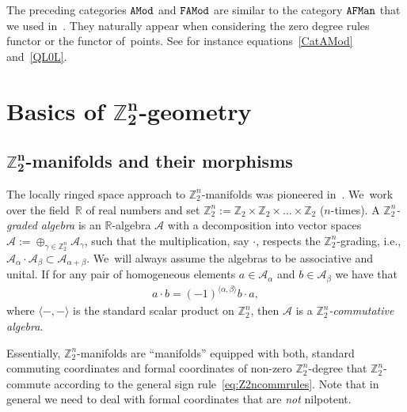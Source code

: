 \documentclass[10pt,a4paper]{amsart}
\newcommand{\R}{{\mathbb R}}
\newcommand{\Z}{{\mathbb Z}}
\newcommand{\0}{\otimes}
\numberwithin{equation}{section}
\begin{document}
The preceding categories $\tt AMod$ and $\tt FAMod$ are similar to the category $\tt AFMan$ that we used in~\cite{Bruce:2019b}. They naturally appear when considering the zero degree rules functor or the functor of~points. See for instance equations~\eqref{CatAMod} and~\eqref{QL0L}.
%
\section[Basics of Z2n-geometry]
{Basics of $\boldsymbol{\Z_2^n}$-geometry}\label{app:ZZnGeom}

\subsection[Z2n-manifolds and their morphisms]
{$\boldsymbol{\Z_2^n}$-manifolds and their morphisms}

The locally ringed space approach to $\Z_{2}^{n}$-manifolds was pioneered in~\cite{Covolo:2016}. We~work over the field~$\R$ of real numbers and set $\Z_2^n := \Z_2 \times \Z_2 \times \dots\times\Z_2$ ($n$-times). A \emph{$\Z_2^n$-graded algebra} is an $\R$-algebra $\mathcal{A}$ with a decomposition into vector spaces $\mathcal{A} := \oplus_{\gamma \in \Z_2^n} \mathcal{A}_\gamma$, such that the multiplication, say $\cdot$, respects the $\Z_2^n$-grading, i.e., $\mathcal{A}_\alpha \cdot \mathcal{A}_\beta \subset \mathcal{A}_{\alpha + \beta}$. We~will always assume the algebras to be associative and unital. If for any pair of homogeneous elements $a \in \mathcal{A}_\alpha$ and $b \in \mathcal{A}_\beta$ we have that
%
\begin{gather}\label{eq:Z2ncommrules}
a \cdot b = (-1)^{\langle \alpha , \beta\rangle } b \cdot a,
\end{gather}
%
where $\langle -, -\rangle$ is the standard scalar product on $\Z_2^n$, then $\mathcal{A}$ is a \emph{$\Z_2^n$-commutative algebra}.

Essentially, $\Z_2^n$-manifolds are ``manifolds'' equipped with both, standard commuting coordinates and formal coordinates of non-zero $\Z_2^n$-degree that $\Z_2^n$-commute according to the general sign rule~\eqref{eq:Z2ncommrules}. Note that in general we need to deal with formal coordinates that are {\it not} nilpotent.
\end{document}
